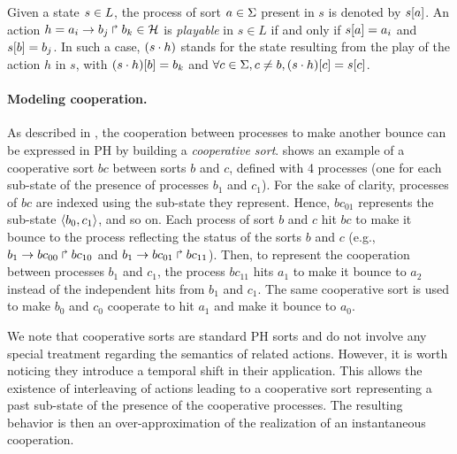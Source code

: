 \noindent
Given a state $s\in L$, the process of sort $a\in\Sigma$ present in $s$ is denoted by ${s[a]}$.
An action $h=a_i\rightarrow b_j\Rsh b_k \in \mathcal{H}$ is \emph{playable} in $s \in L$ if and only if ${s[a]}=a_i$ and ${s[b]} = b_j$.
In such a case, $(s\cdot h)$ stands for the state resulting from the play of the action $h$ in $s$, with
${(s\cdot h)[b]} = b_k$ and $\forall c \in \Sigma, c \neq b, {(s\cdot h)[c]} = {s[c]}$.

\paragraph{Modeling cooperation.}
As described in \cite{PMR10-TCSB}, the cooperation between processes to make another bounce can be
expressed in PH by building a \emph{cooperative sort}.
 shows an example of a cooperative sort $bc$ between sorts $b$ and $c$,
defined with 4 processes (one for each sub-state of the presence of processes $b_1$ and $c_1$).
For the sake of clarity, processes of $bc$ are indexed using the sub-state they represent.
Hence, $bc_{01}$ represents the sub-state $\langle b_0,c_1 \rangle$, and so on.
Each process of sort $b$ and $c$ hit $bc$ to make it bounce to the process reflecting the status of the sorts $b$
and $c$ (e.g., $b_1\rightarrow bc_{00}\Rsh bc_{10}$ and $b_1\rightarrow bc_{01}\Rsh bc_{11}$).
Then, to represent the cooperation between processes $b_1$ and $c_1$,
the process $bc_{11}$ hits $a_1$ to make it bounce to $a_2$ instead of the
independent hits from $b_1$ and $c_1$.
The same cooperative sort is used to make $b_0$ and $c_0$ cooperate to hit $a_1$ and make it bounce to $a_0$.

We note that cooperative sorts are standard PH sorts and do not involve any
special treatment regarding the semantics of related actions.
However, it is worth noticing they introduce a temporal shift in their application.
This allows the existence of interleaving of actions leading to a cooperative sort representing a
past sub-state of the presence of the cooperative processes.
The resulting behavior is then an over-approximation
of the realization of an instantaneous cooperation.

